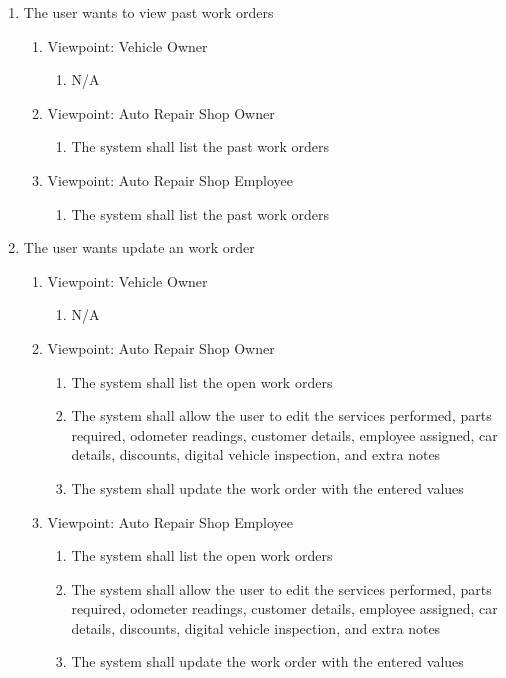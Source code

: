 \documentclass[12pt]{article}
\begin{document}
\begin{enumerate}[resume*=business_events]
	\item The user wants to view past work orders
	      \begin{enumerate}[VP\arabic*.]
		      \item Viewpoint: Vehicle Owner
		            \begin{enumerate}
			            \item[] N/A
		            \end{enumerate}
		      \item Viewpoint: Auto Repair Shop Owner
		            \begin{enumerate}
			            \item The system shall list the past work orders
		            \end{enumerate}
		      \item Viewpoint: Auto Repair Shop Employee
		            \begin{enumerate}
			            \item The system shall list the past work orders
		            \end{enumerate}
	      \end{enumerate}

	\item The user wants update an work order
	      \begin{enumerate}[VP\arabic*.]
		      \item Viewpoint: Vehicle Owner
		            \begin{enumerate}
			            \item[] N/A
		            \end{enumerate}
		      \item Viewpoint: Auto Repair Shop Owner
		            \begin{enumerate}
			            \item The system shall list the open work orders
			            \item The system shall allow the user to edit the services performed, parts required, odometer readings,
			                  customer details, employee assigned, car details, discounts, digital vehicle inspection, and extra
			                  notes
			            \item The system shall update the work order with the entered values
		            \end{enumerate}
		      \item Viewpoint: Auto Repair Shop Employee
		            \begin{enumerate}
			            \item The system shall list the open work orders
			            \item The system shall allow the user to edit the services performed, parts required, odometer readings,
			                  customer details, employee assigned, car details, discounts, digital vehicle inspection, and extra
			                  notes
			            \item The system shall update the work order with the entered values
		            \end{enumerate}
	      \end{enumerate}


\end{enumerate}
\end{document}
